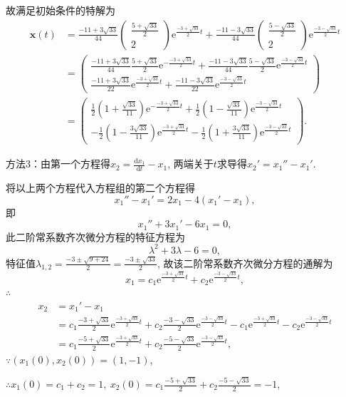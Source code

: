 \documentclass[12pt,UTF8]{ctexart}
\newcommand{\me}[0]{\mathrm e}
\newcommand{\dd}[2]{\frac{\mathrm d #1}{\mathrm d #2}}
\begin{document}
\begin{enumerate}
故满足初始条件的特解为
\[\begin{aligned}
\bm x(t)&=\frac{-11+3\sqrt{33}}{44}\begin{pmatrix}\frac{5+\sqrt{33}}2\\2\end{pmatrix}\me^{\frac{-3+\sqrt{33}}2t}+\frac{-11-3\sqrt{33}}{44}\begin{pmatrix}\frac{5-\sqrt{33}}2\\2\end{pmatrix}\me^{\frac{-3-\sqrt{33}}2t}\\
&=\begin{pmatrix}\frac{-11+3\sqrt{33}}{44}\frac{5+\sqrt{33}}2\me^{-\frac{-3+\sqrt{33}}2t}+\frac{-11-3\sqrt{33}}{44}\frac{5-\sqrt{33}}2\me^{\frac{-3-\sqrt{33}}2t}\\\frac{-11+3\sqrt{33}}{22}\me^{\frac{-3+\sqrt{33}}2t}+\frac{-11-3\sqrt{33}}{22}\me^{\frac{-3-\sqrt{33}}2t}\end{pmatrix}\\
&=\begin{pmatrix}\frac12(1+\frac{\sqrt{33}}{11})\me^{-\frac{-3+\sqrt{33}}2t}+\frac12(1-\frac{\sqrt{33}}{11})\me^{\frac{-3-\sqrt{33}}2t}\\-\frac12(1-\frac{3\sqrt{33}}{11})\me^{\frac{-3+\sqrt{33}}2t}-\frac12(1+\frac{3\sqrt{33}}{11})\me^{\frac{-3-\sqrt{33}}2t}\end{pmatrix}.
\end{aligned}\]

方法3：由第一个方程得$x_2=\dd{x_1}t-x_1$, 两端关于$t$求导得$x_2'=x_1''-x_1'$.

将以上两个方程代入方程组的第二个方程得
\[x_1''-x_1'=2x_1-4(x_1'-x_1),\]
即
\[x_1''+3x_1'-6x_1=0,\]
此二阶常系数齐次微分方程的特征方程为
\[\lambda^2+3\lambda-6=0,\]
特征值$\lambda_{1,2}=\frac{-3\pm\sqrt{9+24}}2=\frac{-3\pm\sqrt{33}}2$, 故该二阶常系数齐次微分方程的通解为
\[x_1=c_1\me^{\frac{-3+\sqrt{33}}2t}+c_2\me^{\frac{-3-\sqrt{33}}2t},\]
$\therefore$
\[\begin{aligned}
x_2&=x_1'-x_1\\
&=c_1\frac{-3+\sqrt{33}}2\me^{\frac{-3+\sqrt{33}}2t}+c_2\frac{-3-\sqrt{33}}2\me^{\frac{-3-\sqrt{33}}2t}-c_1\me^{\frac{-3+\sqrt{33}}2t}-c_2\me^{\frac{-3-\sqrt{33}}2t}\\
&=c_1\frac{-5+\sqrt{33}}2\me^{\frac{-3+\sqrt{33}}2t}+c_2\frac{-5-\sqrt{33}}2\me^{\frac{-3-\sqrt{33}}2t},
\end{aligned}\]
$\because(x_1(0),x_2(0))=(1,-1)$,

$\therefore x_1(0)=c_1+c_2=1,\ x_2(0)=c_1\frac{-5+\sqrt{33}}2+c_2\frac{-5-\sqrt{33}}2=-1$,


\end{enumerate}
\end{document}

